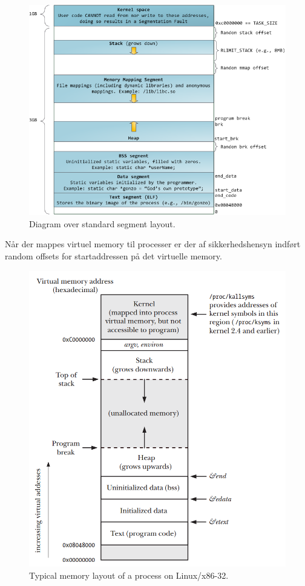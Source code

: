 \begin{figure}[H]
	\centering
	\includegraphics[width=\linewidth]{figs/memorydiagram}
	\caption{Diagram over standard segment layout.}
	\label{fig:memorydiagram}
\end{figure}

Når der mappes virtuel memory til processer er der af sikkerhedshensyn indført random offsets for startaddressen på det virtuelle memory.\\

\begin{figure}
	\centering
	\includegraphics[width=0.7\linewidth]{figs/virtualaddressspace}
	\caption{Typical memory layout of a process on Linux/x86-32.}
	\label{fig:virtualaddressspace}
\end{figure}


